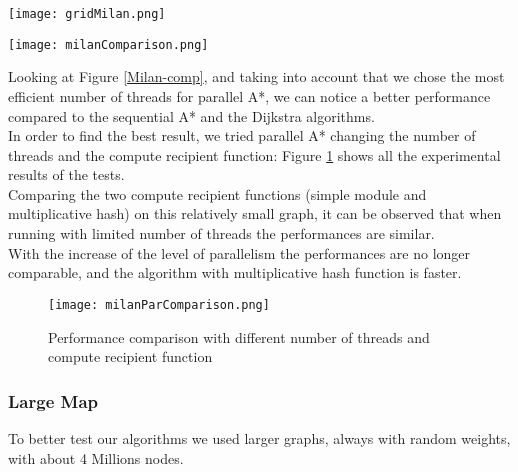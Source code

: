 \begin{center} 
    \begin{minipage}[b]{0.3\textwidth}
        \centering
        \texttt{[image: gridMilan.png]}
        \label{Milan-grid}
    \end{minipage}%
    \hspace{0.5cm}
    \begin{minipage}[b]{0.6\textwidth}
        \centering
        \texttt{[image: milanComparison.png]}
        \label{Milan-comp}
    \end{minipage} 
\end{center}
Looking at Figure \ref{Milan-comp}, and taking into account that we chose the most efficient number of threads for parallel A*,
we can notice a better performance compared to the sequential A* and the Dijkstra algorithms.
\\ 
In order to find the best result, we tried parallel A* changing the number of threads and the compute recipient function:
Figure \ref{Milan-par-comp} shows all the experimental results of the tests.
\\
Comparing the two compute recipient functions (simple module and multiplicative hash)
on this relatively small graph, it can be observed that when running with limited number of threads the performances are similar.
\\
With the increase of the level of parallelism the performances are no longer comparable, and the algorithm with multiplicative hash function is faster.

\begin{figure}
    \centering
    \texttt{[image: milanParComparison.png]}
    \caption{Performance comparison with different number of threads and compute recipient function}
    \label{Milan-par-comp}
\end{figure}

\newpage

\subsubsection{Large Map}

To better test our algorithms we used larger graphs, always with random weights, with about 4 Millions nodes.

